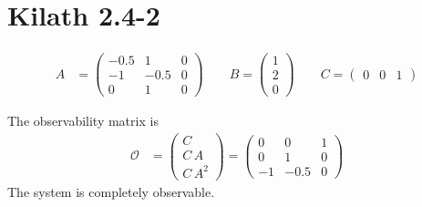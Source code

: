 \section{Kilath 2.4-2}
\begin{align*}
    A &= \begin{pmatrix}
        -0.5 & 1 & 0 \\ -1 & -0.5 & 0 \\ 0 & 1 & 0
    \end{pmatrix} \qquad B = \begin{pmatrix}
        1 \\ 2 \\ 0
    \end{pmatrix} \qquad C = \begin{pmatrix}
        0 & 0 & 1
    \end{pmatrix}
\end{align*}

The observability matrix is 
\begin{align*}
    \mathcal{O} &= \begin{pmatrix}
        C \\ C\,A \\ C\,A^2
    \end{pmatrix} = \begin{pmatrix}
        0 & 0 & 1 \\ 0 & 1 & 0 \\ -1 & -0.5 & 0
    \end{pmatrix}
\end{align*}
The system is completely observable.
